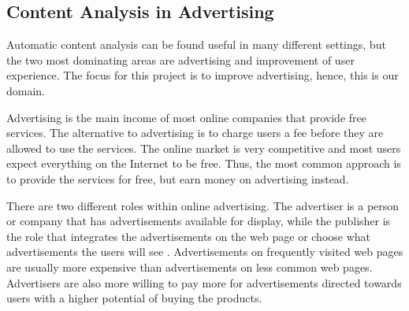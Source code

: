 \subsection{Content Analysis in Advertising}
Automatic content analysis can be found useful in many different settings, but the 
two most dominating areas are advertising and improvement of user experience. The focus for this project is to improve advertising, hence, this is our domain.

Advertising is the main income of most online companies that provide free services. The alternative to advertising is to charge users a fee before they are allowed to use the services. The online market is very competitive and most users expect everything on the Internet to be free. Thus, the most common approach is to provide the services for free, but earn money on advertising instead. 

There are two different roles within online advertising. The advertiser is a person or company that has advertisements available for display, while the publisher is the role that integrates the advertisements on the web page or choose what advertisements the users will see \cite{wiki:onlineadvertising}. Advertisements on frequently visited web pages are usually more expensive than advertisements on less common web pages. Advertisers are also more willing to pay more for advertisements directed towards users with a higher potential of buying the products. 





